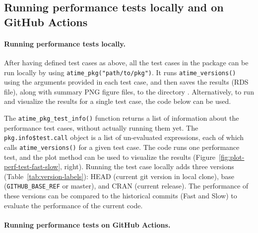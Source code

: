 \subsection{Running performance tests locally and on GitHub Actions}


\paragraph{Running performance tests locally.}
After having defined test cases as above, all the test cases in the package can be run locally by using \verb|atime_pkg("path/to/pkg")|.
It runs \verb|atime_versions()| using the arguments provided in each test case, and then saves the results (RDS file), along with summary PNG figure files, to the directory .
Alternatively, to run and visualize the results for a single test case, the code below can be used.
\begin{Schunk}
\end{Schunk}
The \verb|atime_pkg_test_info()| function returns a list of information about the performance test cases, without actually running them yet.
The \verb|pkg.info$test.call| object is a list of un-evaluated expressions, each of which calls \verb|atime_versions()| for a given test case.
The code  runs one performance test, and the plot method can be used to visualize the results (Figure~\ref{fig:plot-perf-test-fast-slow}, right).
Running the test case locally adds three versions (Table~\ref{tab:version-labels}): HEAD (current git version in local clone), base (\verb|GITHUB_BASE_REF| or master), and CRAN (current release).
The performance of these versions can be compared to the historical commits (Fast and Slow) to evaluate the performance of the current code.

\paragraph{Running performance tests on GitHub Actions.}

